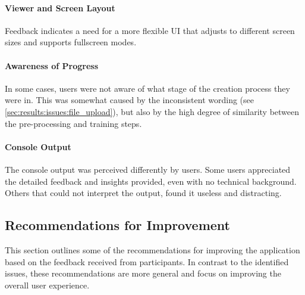 
\paragraph{Viewer and Screen Layout}
Feedback indicates a need for a more flexible UI that adjusts to different screen sizes and supports fullscreen modes.
\cite{P10}

\paragraph{Awareness of Progress}
In some cases, users were not aware of what stage of the creation process they were in.
This was somewhat caused by the inconsistent wording (see \ref{sec:results:issues:file_upload}), but also by the high degree of similarity between the pre-processing and training steps.
\cite{P2}


\paragraph{Console Output}
The console output was perceived differently by users. 
Some users appreciated the detailed feedback and insights provided, even with no technical background. \cite{P5}
Others that could not interpret the output, found it useless and distracting. \cite{P3, P4}


\subsection*{Recommendations for Improvement}
\label{sec:results:recommendations}

This section outlines some of the recommendations for improving the application based on the feedback received from participants. 
In contrast to the identified issues, these recommendations are more general and focus on improving the overall user experience.

